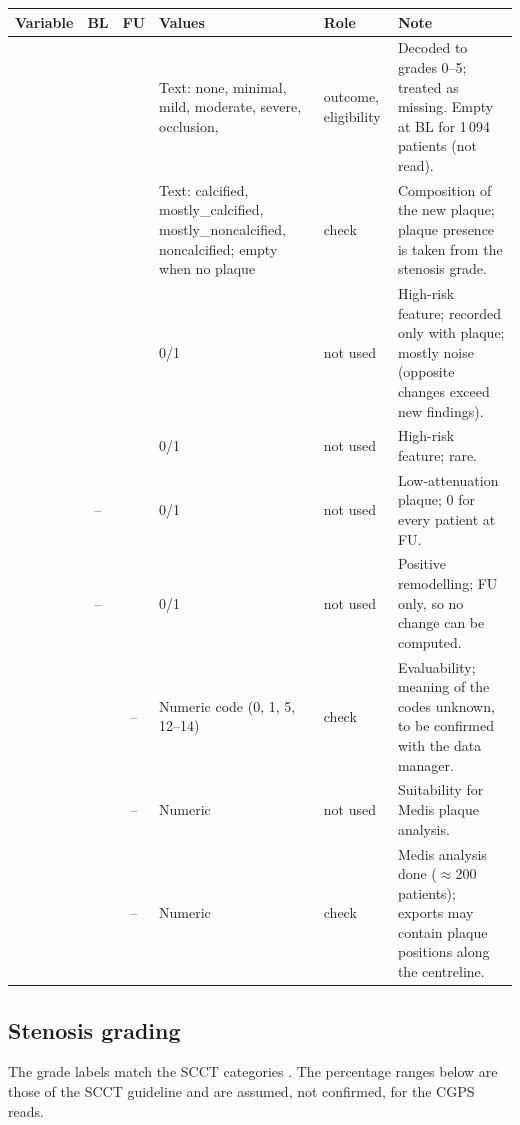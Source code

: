 \documentclass[11pt,a4paper]{article}
\newcommand{\yes}{\checkmark}
\newcommand{\no}{--}
\begin{document}
\begin{longtable}{L{4.3cm} c c L{6.2cm} L{2.2cm} L{7.0cm}}
\toprule
Variable & BL & FU & Values & Role & Note \\
\midrule
\endhead
{} & \yes & \yes &
  Text: none, minimal, mild, moderate, severe, occlusion,  &
  outcome, eligibility &
  Decoded to grades 0--5;  treated as missing. Empty at BL for 1\,094 patients (not read). \\
 & \yes & \yes &
  Text: calcified, mostly\_calcified, mostly\_noncalcified, noncalcified; empty when no plaque &
  check &
  Composition of the new plaque; plaque presence is taken from the stenosis grade. \\
 & \yes & \yes & 0/1 & not used &
  High-risk feature; recorded only with plaque; mostly noise (opposite changes exceed new findings). \\
 & \yes & \yes & 0/1 & not used & High-risk feature; rare. \\
 & \no & \yes & 0/1 & not used & Low-attenuation plaque; 0 for every patient at FU. \\
 & \no & \yes & 0/1 & not used & Positive remodelling; FU only, so no change can be computed. \\
 & \yes & \no & Numeric code (0, 1, 5, 12--14) & check &
  Evaluability; meaning of the codes unknown, to be confirmed with the data manager. \\
 & \yes & \no & Numeric & not used & Suitability for Medis plaque analysis. \\
 & \yes & \no & Numeric & check &
  Medis analysis done ($\approx$200 patients); exports may contain plaque positions along the centreline. \\
\bottomrule
\end{longtable}

\subsection{Stenosis grading}

The grade labels match the SCCT categories \cite{leipsic2014,cury2016}. The percentage ranges below are those
of the SCCT guideline and are assumed, not confirmed, for the CGPS reads.
\end{document}

